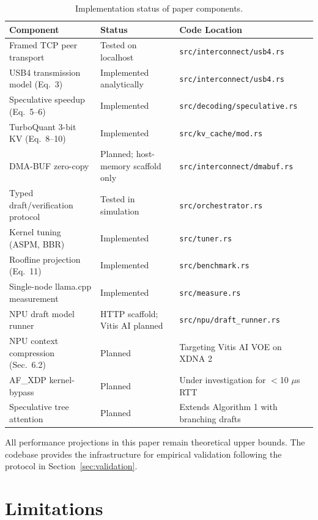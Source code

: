 \documentclass[11pt,a4paper]{article}
\begin{document}
\begin{table}[ht!]
\centering
\caption{Implementation status of paper components.}
\vspace{0.2cm}
\begin{tabular}{p{5cm} p{3cm} p{5cm}}
\toprule
\textbf{Component} & \textbf{Status} & \textbf{Code Location} \\
\midrule
Framed TCP peer transport & Tested on localhost & \texttt{src/interconnect/usb4.rs} \\
USB4 transmission model (Eq.~3) & Implemented analytically & \texttt{src/interconnect/usb4.rs} \\
Speculative speedup (Eq.~5--6) & Implemented & \texttt{src/decoding/speculative.rs} \\
TurboQuant 3-bit KV (Eq.~8--10) & Implemented & \texttt{src/kv\_cache/mod.rs} \\
DMA-BUF zero-copy & Planned; host-memory scaffold only & \texttt{src/interconnect/dmabuf.rs} \\
Typed draft/verification protocol & Tested in simulation & \texttt{src/orchestrator.rs} \\
Kernel tuning (ASPM, BBR) & Implemented & \texttt{src/tuner.rs} \\
Roofline projection (Eq.~11) & Implemented & \texttt{src/benchmark.rs} \\
Single-node llama.cpp measurement & Implemented & \texttt{src/measure.rs} \\
NPU draft model runner & HTTP scaffold; Vitis AI planned & \texttt{src/npu/draft\_runner.rs} \\
\midrule
NPU context compression (Sec.~6.2) & Planned & Targeting Vitis AI VOE on XDNA 2 \\
AF\_XDP kernel-bypass & Planned & Under investigation for $<$10 $\mu$s RTT \\
Speculative tree attention & Planned & Extends Algorithm 1 with branching drafts \\
\bottomrule
\end{tabular}
\label{tab:implementation}
\end{table}

\noindent All performance projections in this paper remain theoretical upper bounds. The codebase provides the infrastructure for empirical validation following the protocol in Section~\ref{sec:validation}.

\section{Limitations}
\end{document}
